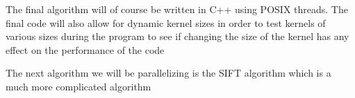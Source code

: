 \documentclass{article}
\begin{document}
        The final algorithm will of course be written in C++ using POSIX threads.  The final code will also allow for dynamic kernel sizes in order to test kernels of various sizes during the program to see if changing the size of the kernel has any effect on the performance of the code
        
        The next algorithm we will be parallelizing is the SIFT algorithm which is a much more complicated algorithm
        \pagebreak
\end{document}
